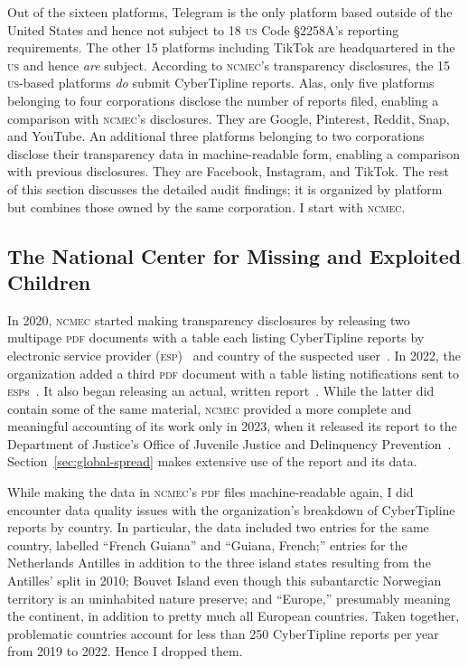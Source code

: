 \documentclass[nonacm,screen]{acmart}
\newcommand\V[1]{\textsc{\MakeLowercase{#1}}}
\begin{document}
Out of the sixteen platforms, Telegram is the only platform based outside of the
United States and hence not subject to 18 \V{US} Code \S2258A's reporting
requirements. The other 15 platforms including TikTok are headquartered in the
\V{US} and hence \emph{are} subject. According to \V{NCMEC}'s transparency
disclosures, the 15 \V{US}-based platforms \emph{do} submit CyberTipline
reports. Alas, only five platforms belonging to four corporations disclose the
number of reports filed, enabling a comparison with \V{NCMEC}'s disclosures.
They are Google, Pinterest, Reddit, Snap, and YouTube. An additional three
platforms belonging to two corporations disclose their transparency data in
machine-readable form, enabling a comparison with previous disclosures. They are
Facebook, Instagram, and TikTok. The rest of this section discusses the detailed
audit findings; it is organized by platform but combines those owned by the same
corporation. I start with \V{NCMEC}.


\subsection{The National Center for Missing and Exploited Children}

In 2020, \V{NCMEC} started making transparency disclosures by releasing two
multipage \V{PDF} documents with a table each listing CyberTipline reports by
electronic service provider (\V{ESP})~\cite{NcmecByPlatform2019,
NcmecByPlatform2020,NcmecByPlatform2021,NcmecByPlatform2022} and country of the
suspected user~\cite{NcmecByCountry2019,NcmecByCountry2020,NcmecByCountry2021,
NcmecByCountry2020}. In 2022, the organization added a third \V{PDF} document
with a table listing notifications sent to
\V{ESP}s~\cite{NcmecNotifications2021,NcmecNotifications2022}. It also began
releasing an actual, written
report~\cite{NcmecCyberTipline2021,NcmecCyberTipline2022}. While the latter did
contain some of the same material, \V{NCMEC} provided a more complete and
meaningful accounting of its work only in 2023, when it released its report to
the Department of Justice's Office of Juvenile Justice and Delinquency
Prevention~\cite{NCMEC2023}. Section~\ref{sec:global-spread} makes extensive use
of the report and its data.

While making the data in \V{NCMEC}'s \V{PDF} files machine-readable again, I did
encounter data quality issues with the organization's breakdown of CyberTipline
reports by country. In particular, the data included two entries for the same
country, labelled ``French Guiana'' and ``Guiana, French;'' entries for the
Netherlands Antilles in addition to the three island states resulting from the
Antilles' split in 2010; Bouvet Island even though this subantarctic Norwegian
territory is an uninhabited nature preserve; and ``Europe,'' presumably meaning
the continent, in addition to pretty much all European countries. Taken
together, problematic countries account for less than 250 CyberTipline reports
per year from 2019 to 2022. Hence I dropped them.
\end{document}
